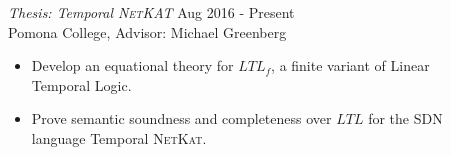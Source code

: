 {\sl Thesis: Temporal \textsc{NetKAT}} \hfill  Aug 2016 - Present \\
Pomona College, Advisor: Michael Greenberg
\begin{itemize} \itemsep -2pt
  \item Develop an equational theory for $LTL_f$, a finite variant of Linear\\
  Temporal Logic.

  \item Prove semantic soundness and completeness over $LTL$ for the SDN \\
  language Temporal \textsc{NetKat}.
\end{itemize}
